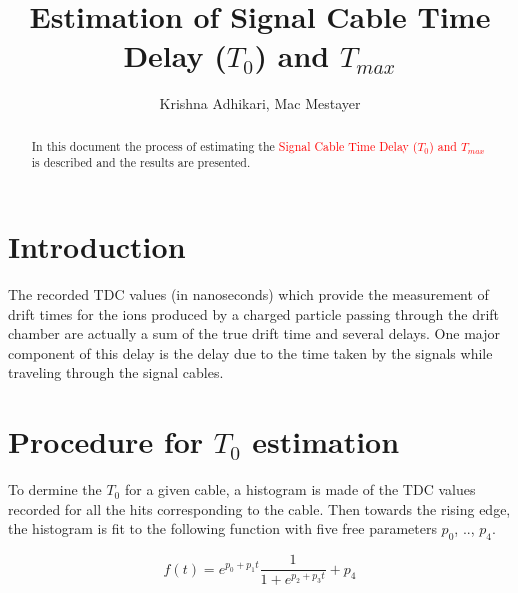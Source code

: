 \documentclass[12pt,epsfig]{article}
\def\t0{$T_0$ }
\begin{document}
\title{Estimation of Signal Cable Time Delay ($T_0$) and $T_{max}$}
\author{Krishna Adhikari, Mac Mestayer}

\maketitle

\begin{abstract}
In this document the process of estimating the \textcolor{red}{Signal Cable Time Delay ($T_0$) and $T_{max}$} 
is described and the results are presented. %
\end{abstract}

\tableofcontents

\pagebreak



\section{Introduction}
\FloatBarrier

The recorded TDC values (in nanoseconds) which provide the measurement of drift times for the ions produced by a charged particle passing through the drift chamber are actually a sum of the true drift time and several delays. One major component of this delay is the delay due to the time taken by the signals while traveling through the signal cables.


\section{Procedure for \t0 estimation}
To dermine the $T_0$ for a given cable, a histogram is made of the TDC values recorded for all the hits corresponding to the cable. Then towards the rising edge, the histogram is fit to the following function with five free parameters $p_0$, .., $p_4$.



\begin{equation}
    \label{T0fit}
    f(t) = e^{p_0 + p_1t} \frac{1}{1 + e^{p_2 + p_3t}}  + p_4
\end{equation}
\end{document}
